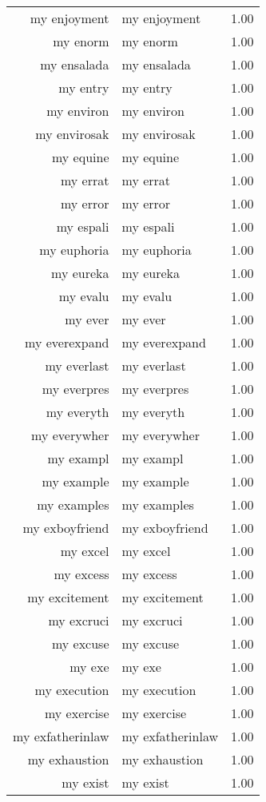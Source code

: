 \begin{table}[ht]
\begin{tabular}{rlr}
  my enjoyment & my enjoyment & 1.00 \\ 
  my enorm & my enorm & 1.00 \\ 
  my ensalada & my ensalada & 1.00 \\ 
  my entry & my entry & 1.00 \\ 
  my environ & my environ & 1.00 \\ 
  my envirosak & my envirosak & 1.00 \\ 
  my equine & my equine & 1.00 \\ 
  my errat & my errat & 1.00 \\ 
  my error & my error & 1.00 \\ 
  my espali & my espali & 1.00 \\ 
  my euphoria & my euphoria & 1.00 \\ 
  my eureka & my eureka & 1.00 \\ 
  my evalu & my evalu & 1.00 \\ 
  my ever & my ever & 1.00 \\ 
  my everexpand & my everexpand & 1.00 \\ 
  my everlast & my everlast & 1.00 \\ 
  my everpres & my everpres & 1.00 \\ 
  my everyth & my everyth & 1.00 \\ 
  my everywher & my everywher & 1.00 \\ 
  my exampl & my exampl & 1.00 \\ 
  my example & my example & 1.00 \\ 
  my examples & my examples & 1.00 \\ 
  my exboyfriend & my exboyfriend & 1.00 \\ 
  my excel & my excel & 1.00 \\ 
  my excess & my excess & 1.00 \\ 
  my excitement & my excitement & 1.00 \\ 
  my excruci & my excruci & 1.00 \\ 
  my excuse & my excuse & 1.00 \\ 
  my exe & my exe & 1.00 \\ 
  my execution & my execution & 1.00 \\ 
  my exercise & my exercise & 1.00 \\ 
  my exfatherinlaw & my exfatherinlaw & 1.00 \\ 
  my exhaustion & my exhaustion & 1.00 \\ 
  my exist & my exist & 1.00 \\ 

\end{tabular}
\end{table}
